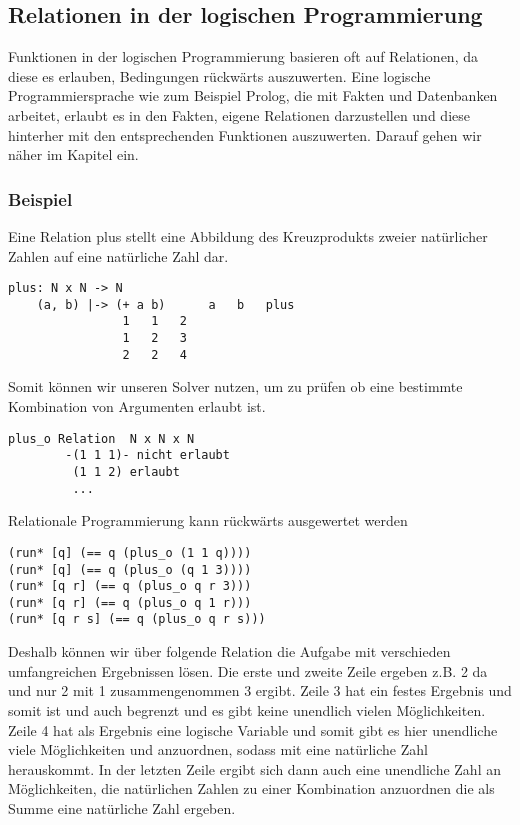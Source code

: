 \subsection{Relationen in der logischen Programmierung}

Funktionen in der logischen Programmierung basieren oft auf Relationen, da diese es erlauben, Bedingungen rückwärts auszuwerten. Eine logische Programmiersprache wie zum Beispiel Prolog, die mit Fakten und Datenbanken arbeitet, erlaubt es in den Fakten, eigene Relationen darzustellen und diese hinterher mit den entsprechenden Funktionen auszuwerten. Darauf gehen wir näher im Kapitel \emph{} ein.

\subsubsection{Beispiel}

Eine Relation plus stellt eine Abbildung des Kreuzprodukts zweier natürlicher Zahlen auf eine natürliche Zahl dar.

\begin{lstlisting}
plus: N x N -> N
    (a, b) |-> (+ a b)		a   b   plus
				1   1   2
				1   2   3
				2   2   4
\end{lstlisting}
Somit können wir unseren Solver nutzen, um zu prüfen ob eine bestimmte Kombination von Argumenten erlaubt ist.

\begin{lstlisting}
plus_o Relation	 N x N x N
		-(1 1 1)- nicht erlaubt
		 (1 1 2) erlaubt
		 ...
\end{lstlisting}
Relationale Programmierung kann rückwärts ausgewertet werden

\begin{lstlisting}
(run* [q] (== q (plus_o (1 1 q))))
(run* [q] (== q (plus_o (q 1 3))))
(run* [q r] (== q (plus_o q r 3)))
(run* [q r] (== q (plus_o q 1 r)))
(run* [q r s] (== q (plus_o q r s)))
\end{lstlisting}
Deshalb können wir über folgende Relation die Aufgabe mit verschieden umfangreichen Ergebnissen \dq{}lösen\dq{}. Die erste und zweite Zeile ergeben z.B. 2 da  und nur 2 mit 1 zusammengenommen 3 ergibt. Zeile 3 hat ein festes Ergebnis und somit ist  und  auch begrenzt und es gibt keine unendlich vielen Möglichkeiten. Zeile 4 hat als Ergebnis eine logische Variable und somit gibt es hier unendliche viele Möglichkeiten  und  anzuordnen, sodass mit  eine natürliche Zahl herauskommt. In der letzten Zeile ergibt sich dann auch eine unendliche Zahl an Möglichkeiten, die natürlichen Zahlen zu einer Kombination anzuordnen die als Summe eine natürliche Zahl ergeben.


